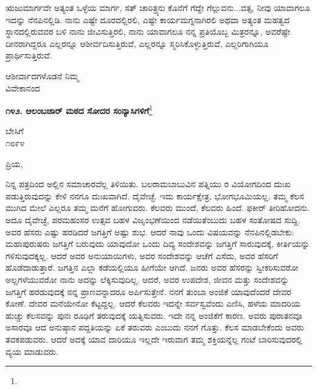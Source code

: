 ಋಜುಮಾರ್ಗವೇ ಅತ್ಯಂತ ಒಳ್ಳೆಯ ಮಾರ್ಗ, ಸತ್ ಚಾರಿತ್ರ್ಯನು ಕೊನೆಗೆ ಗೆದ್ದೇ ಗೆಲ್ಲುವನು...ವತ್ಸ, ನೀವು ಯಾವಾಗಲೂ ಇದನ್ನು ನೆನಪಿನಲ್ಲಿಡಿ. ನಾನು ಎಷ್ಟೇ ದೂರದಲ್ಲಿ\break ರಲಿ, ಎಷ್ಟೇ ಕಾರ್ಯಮಗ್ನನಾಗಿರಲಿ ಅಥವಾ ಅತ್ಯಂತ ಮಹತ್ವದ ಸ್ಥಾನದಲ್ಲಿರುವವರ ಬಳಿ ನಾನು ಜೀವಿಸುತ್ತಿರಲಿ, ನಾನು ಯಾವಾಗಲೂ ನನ್ನ ಪ್ರತಿಯೊಬ್ಬ ಮಿತ್ರರನ್ನೂ, ಅವರೆಷ್ಟೇ ದೀನರಾಗಿದ್ದರೂ ಎಲ್ಲರನ್ನೂ ಆಶೀರ್ವದಿಸುತ್ತಿರುವೆ, ಎಲ್ಲರನ್ನೂ ಸ್ಮರಿಸಿಕೊಳ್ಳುತ್ತಿರುವೆ, ಎಲ್ಲರಿಗಾಗಿಯೂ ಪ್ರಾರ್ಥಿಸುತ್ತಿರುವೆ.

\vspace{-0.5cm}

{\flushright
ಆಶೀರ್ವಾದಗಳೊಡನೆ ನಿಮ್ಮ\\ವಿವೇಕಾನಂದ\par}

\begin{center}
\textbf{೧೪೨. ಆಲಂಬಜಾರ್‌ ಮಠದ ಸೋದರ ಸಂನ್ಯಾಸಿಗಳಿಗೆ}\footnote{}
\end{center}

\vspace{-0.5cm}

\begin{flushright}
ಬೇಸಿಗೆ\\೧೮೯೪
\end{flushright}

\vspace{-0.5cm}

\noindent
ಪ್ರಿಯ,

ನಿನ್ನ ಪತ್ರದಿಂದ ಅಲ್ಲಿನ ಸಮಾಚಾರವೆಲ್ಲ ತಿಳಿಯಿತು. ಬಲರಾಮಬಾಬುವಿನ ಪತ್ನಿಯು\enginline{-} ರ ವಿಯೋಗದಿಂದ ದುಃಖ ಪಡುತ್ತಿರುವುದನ್ನು ಕೇಳಿ ನನಗೂ ದುಃಖವಾಗಿದೆ. ದೈವೇಚ್ಛೆ. ಇದು ಕಾರ್ಯಕ್ಷೇತ್ರ, ಭೋಗಭೂಮಿಯಲ್ಲ. ತಮ್ಮ ಕೆಲಸ ಮುಗಿದ ಮೇಲೆ ಎಲ್ಲರೂ ತಮ್ಮ ಮನೆಗೆ ಹೋಗುವರು. ಕೆಲವರು ಮುಂದೆ, ಕೆಲವರು ಹಿಂದೆ. ಫಕೀರ್ ತೀರಿಹೋದನು. ಅದೂ ದೈವೇಚ್ಛೆ, ಪರಮಹಂಸರ ಉತ್ಸವ ಬಹಳ ವಿಜೃಂಭಣೆಯಿಂದ ನಡೆಯಿತೆಂಬುದು ಬಹಳ ಸಂತೋಷದ ಸುದ್ದಿ. ಅವರ ಹೆಸರು ಎಷ್ಟು ಹರಡಿದರೆ ಜಗತ್ತಿಗೆ ಅಷ್ಟು ಶುಭ. ಆದರೆ ನಾವು ಒಂದು ವಿಷಯವನ್ನು ನೆನಪಿನಲ್ಲಿಡಬೇಕು: ಮಹಾಪುರುಷರು ಜಗತ್ತಿಗೆ ಬರುವುದು ಯಾವುದೋ ಒಂದು ದಿವ್ಯ ಸಂದೇಶವನ್ನು ಜಗತ್ತಿಗೆ ಸಾರುವುದಕ್ಕೆ, ಕೀರ್ತಿಯನ್ನು ಗಳಿಸುವುದಕ್ಕಲ್ಲ. ಆದರೆ ಅವರ ಅನುಯಾಯಿಗಳು, ಅವರ ಸಂದೇಶವನ್ನು ಆಚೆಗೆ ಎಸೆದು, ಅವರ ಹೆಸರಿಗೆ ಹೊಡೆದಾಡುತ್ತಾರೆ. ಜಗತ್ತಿನ ಎಲ್ಲಾ ಕಡೆಯಲ್ಲಿಯೂ ಹೀಗೆಯೇ ಆಗಿದೆ. ಜನರು ಅವರ ಹೆಸರನ್ನು ಸ್ವೀಕರಿಸುವರೋ ಅಲ್ಲಗಳೆಯುವರೋ ನಾನು ಅದನ್ನು ಲೆಕ್ಕಿಸುವುದಿಲ್ಲ. ಆದರೆ, ಅವರ ಉಪದೇಶ, ಜೀವನ ಮತ್ತು ಸಂದೇಶವನ್ನು ಜಗತ್ತಿಗೆ ಹರಡುವುದಕ್ಕೆ ನನ್ನ ಪ್ರಾಣವನ್ನಾದರೂ ಅರ್ಪಿಸುತ್ತೇನೆ. ನನಗೆ ತುಂಬಾ ಅಂಜಿಕೆ ಯಾವುದೆಂದರೆ ದೇವರ ಕೋಣೆ. ದೇವರ ಮನೆಯೇನೋ ಕೆಟ್ಟದ್ದಲ್ಲ. ಆದರೆ ಕೆಲವರು ಇದನ್ನೇ ಸರ್ವಸ್ವವೆಂದು ಎಣಿಸಿ, ಹಳೆಯ ಮಾದರಿಯ ಹುಚ್ಚು ಕೆಲಸವನ್ನು ಪುನಃ ರೂಢಿಗೆ ತರುವುದಕ್ಕೆ ಯತ್ನಿಸುವರು. ಇದೇ ನನ್ನ ಅಂಜಿಕೆಗೆ ಕಾರಣ. ಅವರು ಪುರಾತನವೂ ಅಸಾರವೂ ಆದ ಅನುಷ್ಠಾನ ಪದ್ದತಿಯನ್ನು ಏಕೆ ತರುವರು ಎಂಬುದು ನನಗೆ ಗೊತ್ತು. ಕೆಲಸ ಮಾಡಬೇಕೆಂದು ಅವರು ತವಕಪಡುವರು. ಆದರೆ ಅದಕ್ಕೆ ಯಾವ ದಾರಿಯೂ ಇಲ್ಲದೇ ಇರುವಾಗ ತಮ್ಮ ಶಕ್ತಿಯನ್ನೆಲ್ಲ ಗಂಟೆ ಬಾರಿಸುವುದರಲ್ಲಿ ವ್ಯಯ ಮಾಡುವರು.

